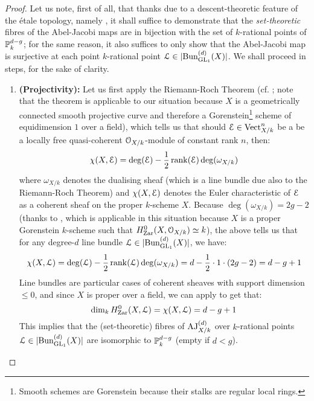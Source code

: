                 \begin{proof}
                    Let us note, first of all, that thanks due to a descent-theoretic feature of the \'etale topology, namely \cite[\href{https://stacks.math.columbia.edu/tag/024V}{Tag 024V}]{stacks}, it shall suffice to demonstrate that the \textit{set-theoretic} fibres of the Abel-Jacobi maps are in bijection with the set of $k$-rational points of $\P_k^{d - g}$; for the same reason, it also suffices to only show that the Abel-Jacobi map is surjective at each point $k$-rational point $\calL \in |\Bun_{\GL_1}^{(d)}(X)|$. We shall proceed in steps, for the sake of clarity.
                        \begin{enumerate}
                            \item \textbf{(Projectivity):} Let us first apply the Riemann-Roch Theorem (cf. \cite[\href{https://stacks.math.columbia.edu/tag/0BS6}{Tag 0BS6}]{stacks}; note that the theorem is applicable to our situation because $X$ is a geometrically connected smooth projective curve and therefore a Gorenstein\footnote{Smooth schemes are Gorenstein because their stalks are regular local rings.} scheme of equidimension $1$ over a field), which tells us that should $\E \in \Vect_{X/k}^n$ be a be a locally free quasi-coherent $\calO_{X/k}$-module of constant rank $n$, then:
                                $$\chi(X, \E) = \deg(\E) - \frac12\rank(\E) \deg(\omega_{X/k})$$
                            where $\omega_{X/k}$ denotes the dualising sheaf (which is a line bundle due also to the Riemann-Roch Theorem) and $\chi(X, \E)$ denotes the Euler characteristic of $\E$ as a coherent sheaf on the proper $k$-scheme $X$. Because $\deg(\omega_{X/k}) = 2g - 2$ (thanks to \cite[\href{https://stacks.math.columbia.edu/tag/0C19}{Tag 0C19}]{stacks}, which is applicable in this situation because $X$ is a proper Gorenstein $k$-scheme such that $H^0_{\Zar}(X, \calO_{X/k}) \cong k$), the above tells us that for any degree-$d$ line bundle $\calL \in |\Bun_{\GL_1}^{(d)}(X)|$, we have:
                                $$\chi(X, \calL) = \deg(\calL) - \frac12 \rank(\calL) \deg(\omega_{X/k}) = d - \frac12 \cdot 1 \cdot (2g - 2) = d - g + 1$$
                            Line bundles are particular cases of coherent sheaves with support dimension $\leq 0$, and since $X$ is proper over a field, we can apply \cite[\href{https://stacks.math.columbia.edu/tag/0AYT}{Tag 0AYT}]{stacks} to get that:
                                $$\dim_k H^0_{\Zar}(X, \calL) = \chi(X, \calL) = d - g + 1$$
                            This implies that the (set-theoretic) fibres of $\AJ_{X/k}^{(d)}$ over $k$-rational points $\calL \in |\Bun_{\GL_1}^{(d)}(X)|$ are isomorphic to $\P^{d - g}_k$ (empty if $d < g$).

\end{enumerate}
\end{proof}
